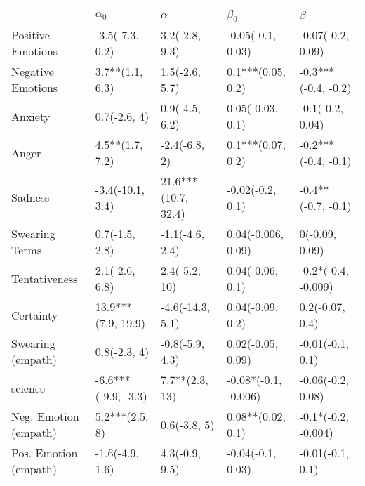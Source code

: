 \begin{tabular}{lllll}
\toprule
{} &           $\alpha_0$ &             $\alpha$ &             $\beta_0$ &              $\beta$ \\
\midrule
Positive Emotions     &      -3.5(-7.3, 0.2) &       3.2(-2.8, 9.3) &     -0.05(-0.1, 0.03) &    -0.07(-0.2, 0.09) \\
Negative Emotions     &      3.7**(1.1, 6.3) &       1.5(-2.6, 5.7) &     0.1***(0.05, 0.2) &  -0.3***(-0.4, -0.2) \\
Anxiety               &         0.7(-2.6, 4) &       0.9(-4.5, 6.2) &      0.05(-0.03, 0.1) &     -0.1(-0.2, 0.04) \\
Anger                 &      4.5**(1.7, 7.2) &        -2.4(-6.8, 2) &     0.1***(0.07, 0.2) &  -0.2***(-0.4, -0.1) \\
Sadness               &     -3.4(-10.1, 3.4) &  21.6***(10.7, 32.4) &      -0.02(-0.2, 0.1) &   -0.4**(-0.7, -0.1) \\
Swearing Terms        &       0.7(-1.5, 2.8) &      -1.1(-4.6, 2.4) &    0.04(-0.006, 0.09) &       0(-0.09, 0.09) \\
Tentativeness         &       2.1(-2.6, 6.8) &        2.4(-5.2, 10) &      0.04(-0.06, 0.1) &  -0.2*(-0.4, -0.009) \\
Certainty             &   13.9***(7.9, 19.9) &     -4.6(-14.3, 5.1) &      0.04(-0.09, 0.2) &      0.2(-0.07, 0.4) \\
Swearing (empath)     &         0.8(-2.3, 4) &      -0.8(-5.9, 4.3) &     0.02(-0.05, 0.09) &     -0.01(-0.1, 0.1) \\
science               &  -6.6***(-9.9, -3.3) &       7.7**(2.3, 13) &  -0.08*(-0.1, -0.006) &    -0.06(-0.2, 0.08) \\
Neg. Emotion (empath) &       5.2***(2.5, 8) &         0.6(-3.8, 5) &     0.08**(0.02, 0.1) &  -0.1*(-0.2, -0.004) \\
Pos. Emotion (empath) &      -1.6(-4.9, 1.6) &       4.3(-0.9, 9.5) &     -0.04(-0.1, 0.03) &     -0.01(-0.1, 0.1) \\
\bottomrule
\end{tabular}
